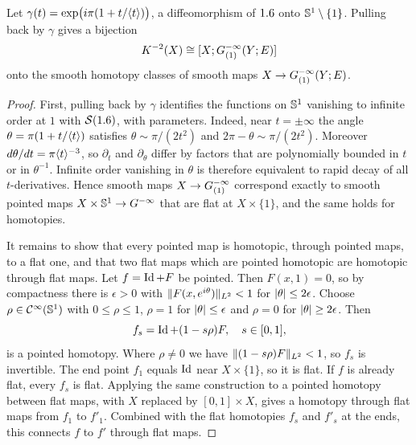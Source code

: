 \begin{proposition}\label{index:prop:K2-loop}
  Let $\gamma(t)=\exp\bigl(i\pi(1+t/\langle t\rangle)\bigr)$, a diffeomorphism of $1.6$
  onto $\mathbb{S}^1\setminus\{1\}$. Pulling back by $\gamma$ gives a
  bijection
  \begin{equation*}
    K^{-2}(X)\cong[X;G^{-\infty}_{(1)}(Y;E)]
  \end{equation*}
  onto the smooth homotopy classes of smooth maps $X\to G^{-\infty}_{(1)}(Y;E)$.
\end{proposition}
\begin{proof}
  First, pulling back by $\gamma$ identifies the functions on $\mathbb{S}^1$
  vanishing to infinite order at $1$ with $\mathcal{S}(1.6)$, with parameters. Indeed,
  near $t=\pm\infty$ the angle $\theta=\pi(1+t/\langle t\rangle)$ satisfies
  $\theta\sim\pi/(2t^2)$ and $2\pi-\theta\sim\pi/(2t^2)$. Moreover
  $d\theta/dt=\pi\langle t\rangle^{-3}$, so $\partial_t$ and $\partial_\theta$ differ by
  factors that are polynomially bounded in $t$ or in $\theta^{-1}$. Infinite
  order vanishing in $\theta$ is therefore equivalent to rapid decay of all
  $t$-derivatives. Hence smooth maps $X\to G^{-\infty}_{(1)}$ correspond exactly to
  smooth pointed maps $X\times\mathbb{S}^1\to G^{-\infty}$ that are flat at
  $X\times\{1\}$, and the same holds for homotopies.

  It remains to show that every pointed map is homotopic, through pointed
  maps, to a flat one, and that two flat maps which are pointed homotopic are
  homotopic through flat maps. Let $f=\operatorname{Id}+F$ be pointed. Then $F(x,1)=0$, so
  by compactness there is $\epsilon>0$ with $\lVert F(x,e^{i\theta})\rVert_{L^2}<1$
  for $\lvert \theta\rvert\le2\epsilon$. Choose $\rho\in\mathcal{C}^\infty(\mathbb{S}^1)$ with
  $0\le\rho\le1$, $\rho=1$ for $\lvert \theta\rvert\le\epsilon$ and $\rho=0$ for
  $\lvert \theta\rvert\ge2\epsilon$. Then
  \begin{equation*}
    f_s=\operatorname{Id}+(1-s\rho)F,\quad s\in[0,1],
  \end{equation*}
  is a pointed homotopy. Where $\rho\ne0$ we have
  $\lVert (1-s\rho)F\rVert_{L^2}<1$, so $f_s$ is invertible. The end point $f_1$
  equals $\operatorname{Id}$ near $X\times\{1\}$, so it is flat. If $f$ is already flat,
  every $f_s$ is flat. Applying the same construction to a pointed homotopy
  between flat maps, with $X$ replaced by $[0,1]\times X$, gives a homotopy
  through flat maps from $f_1$ to $f'_1$. Combined with the flat homotopies
  $f_s$ and $f'_s$ at the ends, this connects $f$ to $f'$ through flat maps.
\end{proof}

